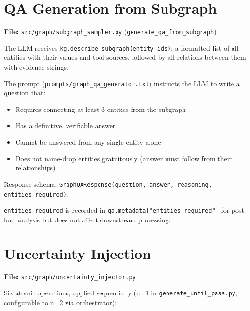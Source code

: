 \documentclass[11pt,a4paper]{article}
\begin{document}
\section{QA Generation from Subgraph}
\label{sec:qagen}

\textbf{File:} \texttt{src/graph/subgraph\_sampler.py} (\texttt{generate\_qa\_from\_subgraph})

The LLM receives \texttt{kg.describe\_subgraph(entity\_ids)}: a formatted list of all entities with their values and tool sources, followed by all relations between them with evidence strings.

The prompt (\texttt{prompts/graph\_qa\_generator.txt}) instructs the LLM to write a question that:
\begin{itemize}[leftmargin=*,noitemsep]
  \item Requires connecting at least 3 entities from the subgraph
  \item Has a definitive, verifiable answer
  \item Cannot be answered from any single entity alone
  \item Does not name-drop entities gratuitously (answer must follow from their relationships)
\end{itemize}

Response schema: \texttt{GraphQAResponse(question, answer, reasoning, entities\_required)}.

\texttt{entities\_required} is recorded in \texttt{qa.metadata["entities\_required"]} for post-hoc analysis but does not affect downstream processing.

\section{Uncertainty Injection}
\label{sec:uncertainty}

\textbf{File:} \texttt{src/graph/uncertainty\_injector.py}

Six atomic operations, applied sequentially (n=1 in \texttt{generate\_until\_pass.py}, configurable to n=2 via orchestrator):
\end{document}
